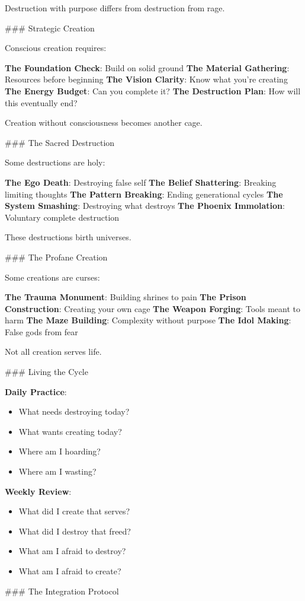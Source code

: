 \documentclass[12pt]{book}
\begin{document}
Destruction with purpose differs from destruction from rage.

\#\#\# Strategic Creation

Conscious creation requires:

\textbf{The Foundation Check}: Build on solid ground
\textbf{The Material Gathering}: Resources before beginning
\textbf{The Vision Clarity}: Know what you're creating
\textbf{The Energy Budget}: Can you complete it?
\textbf{The Destruction Plan}: How will this eventually end?

Creation without consciousness becomes another cage.

\#\#\# The Sacred Destruction

Some destructions are holy:

\textbf{The Ego Death}: Destroying false self
\textbf{The Belief Shattering}: Breaking limiting thoughts
\textbf{The Pattern Breaking}: Ending generational cycles
\textbf{The System Smashing}: Destroying what destroys
\textbf{The Phoenix Immolation}: Voluntary complete destruction

These destructions birth universes.

\#\#\# The Profane Creation

Some creations are curses:

\textbf{The Trauma Monument}: Building shrines to pain
\textbf{The Prison Construction}: Creating your own cage
\textbf{The Weapon Forging}: Tools meant to harm
\textbf{The Maze Building}: Complexity without purpose
\textbf{The Idol Making}: False gods from fear

Not all creation serves life.

\#\#\# Living the Cycle

\textbf{Daily Practice}:
\begin{itemize}
\item What needs destroying today?
\item What wants creating today?
\item Where am I hoarding?
\item Where am I wasting?

\end{itemize}
\textbf{Weekly Review}:
\begin{itemize}
\item What did I create that serves?
\item What did I destroy that freed?
\item What am I afraid to destroy?
\item What am I afraid to create?

\end{itemize}
\#\#\# The Integration Protocol
\end{document}
